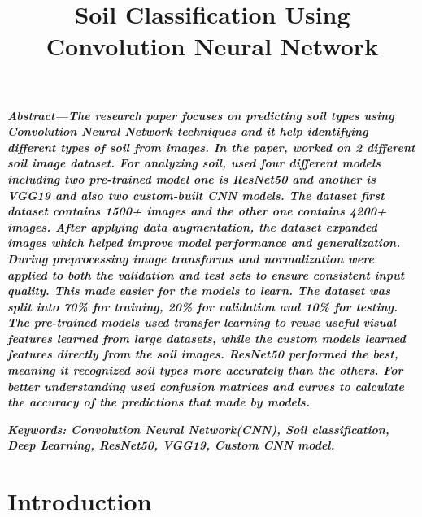 \documentclass[conference]{IEEEtran}
\begin{document}
\title{Soil Classification Using Convolution
Neural Network}

\author{
}

\maketitle


\textit{\textbf{Abstract—The research paper focuses on predicting soil types using Convolution Neural Network techniques and it help identifying different types of soil from images. In the paper, worked on 2 different soil image dataset. For analyzing soil, used four different models including two pre-trained model one is ResNet50 and another is VGG19 and also two custom-built CNN models. The dataset first dataset contains 1500+ images and the other one contains 4200+ images. After applying data augmentation, the dataset expanded images which helped improve model performance and generalization. During preprocessing image transforms and normalization were applied to both the validation and test sets to ensure consistent input quality. This made easier for the models to learn. The dataset was split into 70\% for training, 20\% for validation and 10\% for testing. The pre-trained models used transfer learning to reuse useful visual features learned from large datasets, while the custom models learned features directly from the soil images. ResNet50 performed the best, meaning it recognized soil types more accurately than the others. For better understanding used confusion matrices and curves to calculate the accuracy of the predictions that made by models.}}

\textit{\textbf{Keywords: Convolution Neural Network(CNN), Soil classification, Deep Learning, ResNet50, VGG19, Custom CNN model. }}

\section{Introduction}
\end{document}
